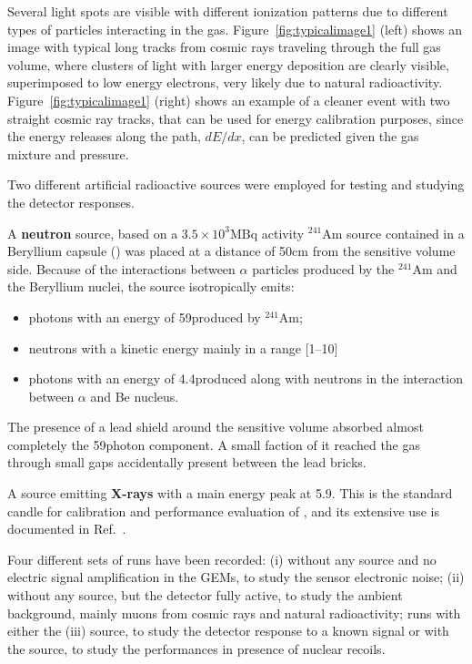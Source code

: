 \documentclass[12pt]{iopart}
\begin{document}
Several light spots are visible with different ionization patterns due
to different types of particles interacting in the gas.
Figure~\ref{fig:typicalimage1} (left) shows an image with typical long
tracks from cosmic rays traveling through the full gas volume, where
clusters of light with larger energy deposition are clearly visible,
superimposed to low energy electrons, very likely due to natural
radioactivity.  Figure~\ref{fig:typicalimage1} (right) shows an
example of a cleaner event with two straight cosmic ray tracks, that
can be used for energy calibration purposes, since the energy releases
along the path, $dE/dx$, can be predicted given the gas mixture and
pressure.

Two different artificial radioactive sources were employed for testing
and studying the detector responses.

\vspace{10pt}

A {\bf neutron} source, based on a $3.5{\times}10^3$\unit{MBq} activity
$^{241}$Am source contained in a Beryllium capsule (\ambe) was placed
at a distance of 50\unit{cm} from the sensitive volume side.  Because
of the interactions between $\alpha$ particles produced by the
$^{241}$Am and the Beryllium nuclei, the \ambe source isotropically
emits:
 \begin{itemize}
     \item photons with an energy of 59\keV produced by $^{241}$Am;
     \item neutrons with a kinetic energy mainly in a range
       [1--10]\MeV
     \item photons with an energy of 4.4\MeV produced along with
       neutrons in the interaction between $\alpha$ and Be nucleus.
 \end{itemize}
 The presence of a lead shield around the sensitive volume absorbed
almost completely the 59\keV photon component. A small faction of it
reached the gas through small gaps accidentally present between the lead
bricks.

\vspace{10pt}

A \fe source emitting {\bf X-rays} with a main energy peak at 5.9\keV.
This is the standard candle for calibration and performance evaluation
of \lemon, and its extensive use is documented in
Ref.~\cite{bib:fe55}.

\vspace{10pt}

Four different sets of runs have been recorded: (i) without any source
and no electric signal amplification in the GEMs, to study the sensor
electronic noise; (ii) without any source, but the detector fully
active, to study the ambient background, mainly muons from cosmic rays
and natural radioactivity; runs with either the (iii) \fe source, to
study the detector response to a known signal or with the \ambe
source, to study the \lemon performances in presence of nuclear
recoils.
\end{document}
